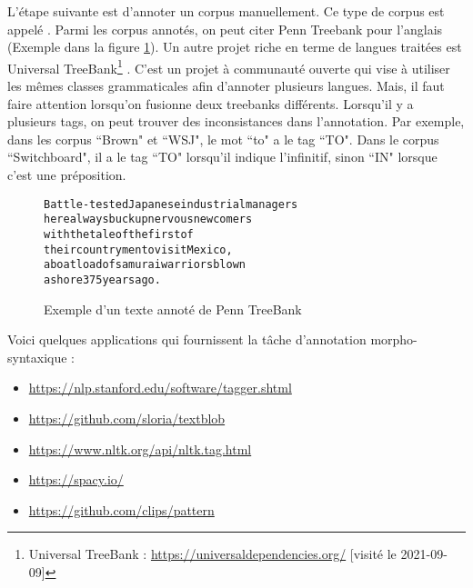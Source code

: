 \documentclass{KodeBook}
\begin{document}
L'étape suivante est d'annoter un corpus manuellement. 
Ce type de corpus est appelé .
Parmi les corpus annotés, on peut citer Penn Treebank pour l'anglais (Exemple dans la figure \ref{fig:penn-exp}).
Un autre projet riche en terme de langues traitées est Universal TreeBank\footnote{Universal TreeBank : \url{https://universaldependencies.org/} [visité le 2021-09-09]} \cite{2012-petrov-al}. 
C'est un projet à communauté ouverte qui vise à utiliser les mêmes classes grammaticales afin d'annoter plusieurs langues. 
Mais, il faut faire attention lorsqu'on fusionne deux treebanks différents. 
Lorsqu'il y a plusieurs tags, on peut trouver des inconsistances dans l'annotation.
Par exemple, dans les corpus ``Brown" et ``WSJ", le mot ``to" a le tag ``TO". 
Dans le corpus ``Switchboard", il a le tag ``TO" lorsqu'il indique l'infinitif, sinon ``IN" lorsque c'est une préposition.
%
\begin{figure}
	\centering
	\begin{tcolorbox}[boxrule=0.4pt,text width=.7\textwidth]
		\footnotesize
		\begin{alltt}
			Battle-tested Japanese industrial managers
			here always buck up nervous newcomers
			with the tale of the first of
			their countrymen to visit Mexico ,\keyword{/,}
			a boatload of samurai warriors blown
			ashore 375 years ago .
		\end{alltt}
	\end{tcolorbox}
	\caption[Exemple d'un texte annoté de Penn TreeBank]{Exemple d'un texte annoté de Penn TreeBank \cite{2003-taylor}\label{fig:penn-exp}}
\end{figure}

Voici quelques applications qui fournissent la tâche d'annotation morpho-syntaxique :
\begin{itemize}
	\item \url{https://nlp.stanford.edu/software/tagger.shtml}
	\item \url{https://github.com/sloria/textblob}
	\item \url{https://www.nltk.org/api/nltk.tag.html}
	\item \url{https://spacy.io/}
	\item \url{https://github.com/clips/pattern}
\end{itemize}
\end{document}
